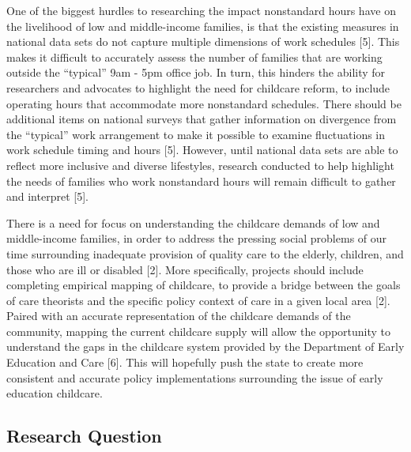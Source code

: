 \documentclass[10pt,letterpaper]{article}
\begin{document}
One of the biggest hurdles to researching the impact nonstandard hours
have on the livelihood of low and middle-income families, is that the
existing measures in national data sets do not capture multiple
dimensions of work schedules {[}5{]}. This makes it difficult to
accurately assess the number of families that are working outside the
``typical'' 9am - 5pm office job. In turn, this hinders the ability for
researchers and advocates to highlight the need for childcare reform, to
include operating hours that accommodate more nonstandard schedules.
There should be additional items on national surveys that gather
information on divergence from the ``typical'' work arrangement to make
it possible to examine fluctuations in work schedule timing and hours
{[}5{]}. However, until national data sets are able to reflect more
inclusive and diverse lifestyles, research conducted to help highlight
the needs of families who work nonstandard hours will remain difficult
to gather and interpret {[}5{]}.

There is a need for focus on understanding the childcare demands of low
and middle-income families, in order to address the pressing social
problems of our time surrounding inadequate provision of quality care to
the elderly, children, and those who are ill or disabled {[}2{]}. More
specifically, projects should include completing empirical mapping of
childcare, to provide a bridge between the goals of care theorists and
the specific policy context of care in a given local area {[}2{]}.
Paired with an accurate representation of the childcare demands of the
community, mapping the current childcare supply will allow the
opportunity to understand the gaps in the childcare system provided by
the Department of Early Education and Care {[}6{]}. This will hopefully
push the state to create more consistent and accurate policy
implementations surrounding the issue of early education childcare.

\subsection{Research Question}\label{research-question}
\end{document}
